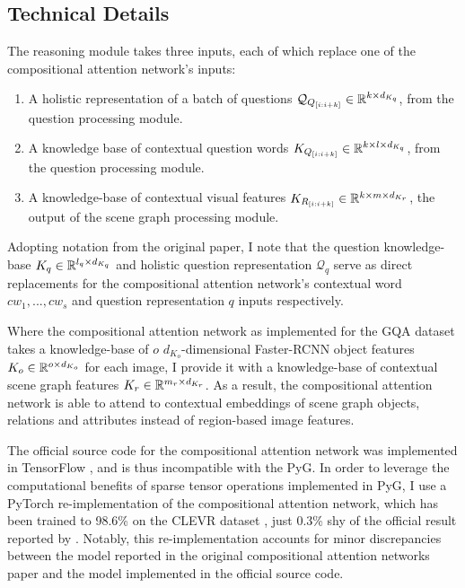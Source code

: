 \subsection{Technical Details}

The reasoning module takes three inputs, each of which replace one of the compositional attention network's inputs:

\begin{enumerate}
    \item A holistic representation of a batch of questions \(\mathcal{Q}_{Q_{[i:i+k]}} \in \mathbb{R}^{k \times d_{K_q}}\), from the question processing module.
    \item A knowledge base of contextual question words \(K_{Q_{[i:i+k]}} \in \mathbb{R}^{k \times l \times d_{K_q}}\), from the question processing module.
    \item A knowledge-base of contextual visual features \(K_{R_{[i:i+k]}} \in \mathbb{R}^{k \times m \times d_{K_r}}\), the output of the scene graph processing module.
\end{enumerate}

Adopting notation from the original paper, I note that the question knowledge-base \(K_q \in \mathbb{R}^{l_q \times d_{K_q}}\) and holistic question representation \(\mathcal{Q}_q\) serve as direct replacements for the compositional attention network's contextual word \(cw_1, ..., cw_s\) and question representation \(q\) inputs respectively.

Where the compositional attention network as implemented for the GQA dataset takes a knowledge-base of \(o\) \(d_{K_o}\)-dimensional Faster-RCNN object features \(K_o \in \mathbb{R}^{o \times d_{K_o}}\) for each image, I provide it with a knowledge-base of contextual scene graph features \(K_r \in \mathbb{R}^{m_r \times d_{K_r}}\). As a result, the compositional attention network is able to attend to contextual embeddings of scene graph objects, relations and attributes instead of region-based image features.

The official source code for the compositional attention network \cite{github-mac-official} was implemented in TensorFlow \cite{tensorflow2015-whitepaper}, and is thus incompatible with the PyG. In order to leverage the computational benefits of sparse tensor operations implemented in PyG, I use a PyTorch re-implementation \cite{github-mac-reimplementation} of the compositional attention network, which has been trained to 98.6\% on the CLEVR dataset \cite{eyzaguirre2020differentiable}, just 0.3\% shy of the official result reported by \citeauthor{hudson2018compositional}. Notably, this re-implementation accounts for minor discrepancies between the model reported in the original compositional attention networks paper and the model implemented in the official source code.

